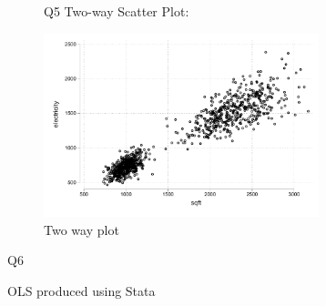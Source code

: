 \documentclass{article}
\begin{document}
\begin{figure}[h!]
Q5
Two-way Scatter Plot:

    \centering
    \includegraphics[width=80mm]{twoway_stata.pdf}
    \caption{Two way plot}
    \label{fig:graph_stata}
\end{figure}




\begin{table}[h!]
Q6
    \centering
    
    \caption{OLS produced using Stata}
    \label{tab:statasummary}
\end{table}
\end{document}
